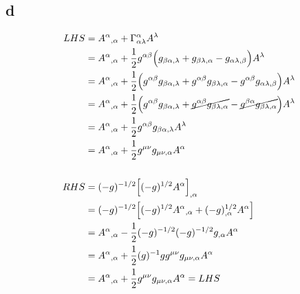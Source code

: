 \documentclass{article}
\begin{document}
\subsection*{d}
\begin{align*}
LHS &= A^\alpha{}_{,\alpha} + \Gamma^{\alpha}_{\alpha\lambda}A^\lambda \\
&= A^\alpha{}_{,\alpha} + \frac{1}{2}g^{\alpha\beta}\Big(g_{\beta\alpha,\lambda} + g_{\beta\lambda, \alpha} - g_{\alpha\lambda,\beta}\Big)A^\lambda \\
&= A^\alpha{}_{,\alpha} + \frac{1}{2}\Big(g^{\alpha\beta}g_{\beta\alpha,\lambda} + g^{\alpha\beta}g_{\beta\lambda, \alpha} -  g^{\alpha\beta}g_{\alpha\lambda,\beta}\Big)A^\lambda \\
&= A^\alpha{}_{,\alpha} + \frac{1}{2}\Big(g^{\alpha\beta}g_{\beta\alpha,\lambda} + \cancel{g^{\alpha\beta}g_{\beta\lambda, \alpha}} -  \cancel{g^{\beta\alpha}g_{\beta\lambda,\alpha}} \Big)A^\lambda  \\
&= A^\alpha{}_{,\alpha} + \frac{1}{2}g^{\alpha\beta}g_{\beta\alpha,\lambda}A^\lambda \\
&= A^\alpha{}_{,\alpha} + \frac{1}{2}g^{\mu\nu}g_{\mu\nu,\alpha}A^\alpha \\\\
RHS &= (-g)^{-1/2}\Big[(-g)^{1/2}A^\alpha\Big]_{,\alpha} \\
&= (-g)^{-1/2}\Big[(-g)^{1/2}A^\alpha{}_{,\alpha} + (-g)^{1/2}_{,\alpha}A^\alpha \Big] \\
& = A^\alpha{}_{,\alpha} - \frac{1}{2}(-g)^{-1/2} (-g)^{-1/2}g_{,\alpha}A^\alpha \\ 
& = A^\alpha{}_{,\alpha} + \frac{1}{2}(g)^{-1}gg^{\mu\nu}g_{\mu\nu,\alpha} A^\alpha \\ 
& = A^\alpha{}_{,\alpha} + \frac{1}{2}g^{\mu\nu}g_{\mu\nu,\alpha} A^\alpha = LHS \\ 
\end{align*}
\end{document}
